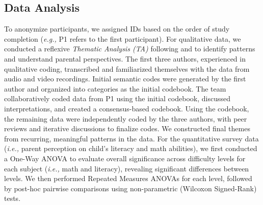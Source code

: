 \subsection{Data Analysis}
To anonymize participants, we assigned IDs based on the order of study completion (\textit{e.g.,} P1 refers to the first participant). For qualitative data, we conducted a reflexive \textit{Thematic Analysis (TA)} following \citet{clarke2014thematic} and \citet{mcdonald2019reliability} to identify patterns and understand parental perspectives. The first three authors, experienced in qualitative coding, transcribed and familiarized themselves with the data from audio and video recordings. Initial semantic codes were generated by the first author and organized into categories as the initial codebook. The team collaboratively coded data from P1 using the initial codebook, discussed interpretations, and created a consensus-based codebook. Using the codebook, the remaining data were independently coded by the three authors, with peer reviews and iterative discussions to finalize codes. We constructed final themes from recurring, meaningful patterns in the data. For the quantitative survey data (\textit{i.e.,} parent perception on child's literacy and math abilities), we first conducted a One-Way ANOVA to evaluate overall significance across difficulty levels for each subject (\textit{i.e.,} math and literacy), revealing significant differences between levels. We then performed Repeated Measures ANOVAs for each level, followed by post-hoc pairwise comparisons using non-parametric (Wilcoxon Signed-Rank) tests.